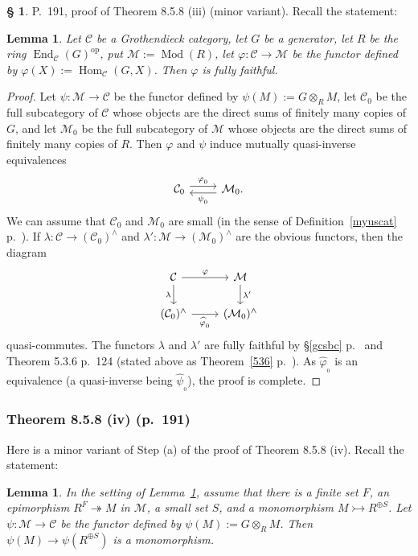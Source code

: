 \documentclass[12pt]{article}
\newtheorem{lem}[thm]{Lemma}
\theoremstyle{remark}
\theoremstyle{definition}
\newtheorem{s}[thm]{\S}
\newcommand{\C}{\mathcal C}
\newcommand{\M}{\mathcal M}
\newcommand{\pp}{\varphi}
\newcommand{\epi}{\twoheadrightarrow}
\DeclareMathOperator{\Hom}{Hom}
\DeclareMathOperator{\Mod}{Mod}
\DeclareMathOperator{\op}{op}
\begin{document}
\begin{s} P.~191, proof of Theorem 8.5.8 (iii) (minor variant). Recall the statement: 

\begin{lem}\label{858iii}
Let $\C$ be a Grothendieck category, let $G$ be a generator, let $R$ be the ring $\operatorname{End}_\C(G)^{\op}$, put $\M:=\Mod(R)$, let $\pp:\C\to\M$ be the functor defined by $\pp(X):=\Hom_\C(G,X)$. Then $\pp$ is fully faithful. 
\end{lem}

\begin{proof}
Let $\psi:\M\to\C$ be the functor defined by $\psi(M):=G\otimes_RM$, let $\C_0$ be the full subcategory of $\C$ whose objects are the direct sums of finitely many copies of $G$, and let $\M_0$ be the full subcategory of $\M$ whose objects are the direct sums of finitely many copies of $R$. Then $\pp$ and $\psi$ induce mutually quasi-inverse equivalences 
$$
\begin{tikzcd}
\C_0\ar[yshift=.7ex]{r}{\pp_{{}_0}}&\M_0.\ar[yshift=-.7ex]{l}{\psi_{{}_0}}
\end{tikzcd}
$$ 
We can assume that $\C_0$ and $\M_0$ are small (in the sense of Definition~\ref{myuscat} p.~\pageref{myuscat}). If $\lambda:\C\to(\C_0)^\wedge$ and $\lambda':\M\to(\M_0)^\wedge$ are the obvious functors, then the diagram 
$$
\begin{tikzcd}
\C\ar{r}{\pp}\ar{d}[swap]{\lambda}&\M\ar{d}{\lambda'}\\
(\C_0)^\wedge\ar{r}[swap]{\widehat\pp_{{}_0}}&(\M_0)^\wedge
\end{tikzcd}
$$ 
quasi-commutes. The functors $\lambda$ and $\lambda'$ are fully faithful by \S\ref{gcsbc} p.~\pageref{gcsbc} and Theorem 5.3.6 p.~124 (stated above as Theorem~\ref{536} p.~\pageref{536}). As $\widehat\pp_{{}_0}$ is an equivalence (a quasi-inverse being $\widehat\psi_{{}_0}$), the proof is complete.
\end{proof}
\end{s}


\subsubsection{Theorem 8.5.8 (iv) (p.~191)} 

Here is a minor variant of Step (a) of the proof of Theorem 8.5.8 (iv). Recall the statement: 

\begin{lem}
In the setting of Lemma~\ref{858iii}, assume that there is a finite set $F$, an epimorphism $R^F\epi M$ in $\M$, a small set $S$, and a monomorphism $M\rightarrowtail R^{\oplus S}$. Let $\psi:\M\to\C$ be the functor defined by $\psi(M):=G\otimes_RM$. Then $\psi(M)\to\psi(R^{\oplus S})$ is a monomorphism. 
\end{lem}
\end{document}
